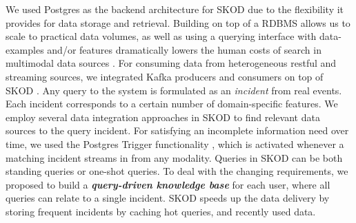 {}
    We used Postgres as the backend architecture for SKOD due to the flexibility it provides for data storage and retrieval. %
    Building on top of a RDBMS allows us to scale to practical data %
    volumes, as well as using a querying interface with data-examples and/or features
    dramatically lowers the human costs of 
    search in multimodal data sources \cite{stonebraker2020surveillance}.
    For consuming data from heterogeneous restful and streaming sources, %
    we integrated Kafka producers and consumers on top of SKOD \cite{palacios2019wip}. 
    Any query to the system is formulated as an \textit{incident} from real events. %
    Each incident corresponds to a certain number of domain-specific features. We employ several data integration approaches in SKOD to find relevant data sources to the query incident.
    For satisfying an incomplete information need over time,
    we used the Postgres Trigger functionality \cite{stonebraker2020surveillance}, which 
    is activated whenever a matching incident streams in from any modality.
    Queries in SKOD can be both standing queries or one-shot queries. To deal with the changing requirements, we proposed to build a \textit{\textbf{query-driven knowledge base}} for each user, where all queries can relate to a single incident. SKOD speeds up the data delivery by storing frequent incidents by caching hot queries, and recently used data.


